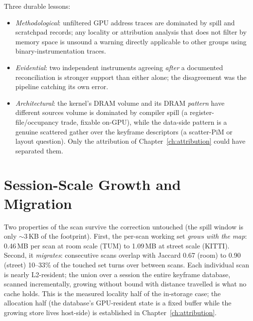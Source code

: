 Three durable lessons:
\begin{itemize}
  \item \emph{Methodological}: unfiltered GPU address traces are dominated by spill and scratchpad records; any locality or attribution analysis that does not filter by memory space is unsound a warning directly applicable to other groups using binary-instrumentation traces.
  \item \emph{Evidential}: two independent instruments agreeing \emph{after} a documented reconciliation is stronger support than either alone; the disagreement was the pipeline catching its own error.
  \item \emph{Architectural}: the kernel's DRAM volume and its DRAM \emph{pattern} have different sources volume is dominated by compiler spill (a register-file/occupancy trade, fixable on-GPU), while the data-side pattern is a genuine scattered gather over the keyframe descriptors (a scatter-PiM or layout question). Only the attribution of Chapter~\ref{ch:attribution} could have separated them.
\end{itemize}

\section{Session-Scale Growth and Migration}
\label{sec:loc-growth}

Two properties of the scan survive the correction untouched (the spill window is only $\sim$3\,KB of the footprint). First, the per-scan working set \emph{grows with the map}: 0.46\,MB per scan at room scale (TUM) to 1.09\,MB at street scale (KITTI). Second, it \emph{migrates}: consecutive scans overlap with Jaccard 0.67 (room) to 0.90 (street) 10--33\% of the touched set turns over between scans. Each individual scan is nearly L2-resident; the union over a session the entire keyframe database, scanned incrementally, growing without bound with distance travelled is what no cache holds. This is the measured locality half of the in-storage case; the allocation half (the database's GPU-resident state is a fixed buffer while the growing store lives host-side) is established in Chapter~\ref{ch:attribution}.